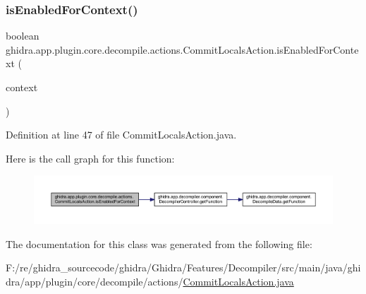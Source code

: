\subsubsection{\texorpdfstring{isEnabledForContext()}{isEnabledForContext()}}
{\footnotesize\ttfamily boolean ghidra.\+app.\+plugin.\+core.\+decompile.\+actions.\+Commit\+Locals\+Action.\+is\+Enabled\+For\+Context (\begin{DoxyParamCaption}\item[{Action\+Context}]{context }\end{DoxyParamCaption})\hspace{0.3cm}{\ttfamily [inline]}}



Definition at line 47 of file Commit\+Locals\+Action.\+java.

Here is the call graph for this function\+:
\nopagebreak
\begin{figure}[H]
\begin{center}
\leavevmode
\includegraphics[width=350pt]{classghidra_1_1app_1_1plugin_1_1core_1_1decompile_1_1actions_1_1_commit_locals_action_abb72f86dc1e28e94bc03d03e41743ebe_cgraph}
\end{center}
\end{figure}


The documentation for this class was generated from the following file\+:\begin{DoxyCompactItemize}
\item 
F\+:/re/ghidra\+\_\+sourcecode/ghidra/\+Ghidra/\+Features/\+Decompiler/src/main/java/ghidra/app/plugin/core/decompile/actions/\mbox{\hyperlink{_commit_locals_action_8java}{Commit\+Locals\+Action.\+java}}\end{DoxyCompactItemize}
